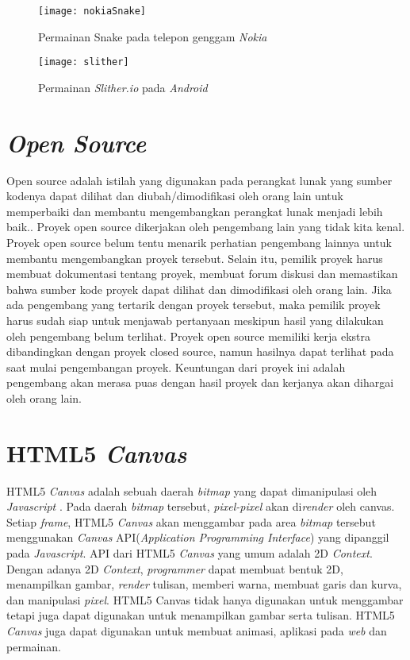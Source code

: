 \begin{figure}[H]
	\centering  
	\texttt{[image: nokiaSnake]}  
	\caption[Permainan Snake pada telepon genggam \textit{Nokia}]{Permainan Snake pada telepon genggam \textit{Nokia}} 
	\label{fig:nokiaSnake} 
\end{figure} 

\begin{figure}[H]
	\centering  
	\texttt{[image: slither]}  
	\caption[Permainan \textit{Slither.io} pada \textit{Android}]{Permainan \textit{Slither.io} pada \textit{Android}} 
	\label{fig:slither} 
\end{figure} 

\section{\textit{Open Source}}
Open source adalah istilah yang digunakan pada perangkat lunak yang sumber kodenya dapat dilihat dan diubah/dimodifikasi oleh orang lain untuk memperbaiki dan membantu mengembangkan perangkat lunak menjadi lebih baik.\cite{fogel2005producing}. Proyek open source dikerjakan oleh pengembang lain yang tidak kita kenal. Proyek open source belum tentu menarik perhatian pengembang lainnya untuk membantu mengembangkan proyek tersebut. Selain itu, pemilik proyek harus membuat dokumentasi tentang proyek, membuat forum diskusi dan memastikan bahwa sumber kode proyek dapat dilihat dan dimodifikasi oleh orang lain. Jika ada pengembang yang tertarik dengan proyek tersebut, maka pemilik proyek harus sudah siap untuk menjawab pertanyaan meskipun hasil yang dilakukan oleh pengembang belum terlihat. Proyek open source memiliki kerja ekstra dibandingkan dengan proyek closed source, namun hasilnya dapat terlihat pada saat mulai pengembangan proyek. Keuntungan dari proyek ini adalah pengembang akan merasa puas dengan hasil proyek dan kerjanya akan dihargai oleh orang lain.

\section{HTML5 \textit{Canvas}}
\label{sec:HTML5Canvas}
HTML5 \textit{Canvas} adalah sebuah daerah \textit{bitmap} yang dapat dimanipulasi oleh \textit{Javascript} \cite{fulton2013html5}. Pada daerah \textit{bitmap} tersebut, \textit{pixel-pixel} akan di\textit{render} oleh canvas. Setiap \textit{frame}, HTML5 \textit{Canvas} akan menggambar pada area \textit{bitmap} tersebut menggunakan \textit{Canvas} API(\textit{Application Programming Interface}) yang dipanggil pada \textit{Javascript}. API dari HTML5 \textit{Canvas} yang umum adalah 2D \textit{Context}. Dengan adanya 2D \textit{Context}, \textit{programmer} dapat membuat bentuk 2D, menampilkan gambar, \textit{render} tulisan, memberi warna, membuat garis dan kurva, dan manipulasi \textit{pixel}. HTML5 Canvas tidak hanya digunakan untuk menggambar tetapi juga dapat digunakan untuk menampilkan gambar serta tulisan. HTML5 \textit{Canvas} juga dapat digunakan untuk membuat animasi, aplikasi pada \textit{web} dan permainan. \\

